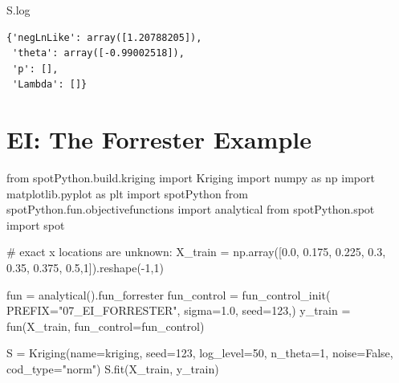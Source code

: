 \documentclass[
  letterpaper,
  DIV=11,
  numbers=noendperiod]{scrreprt}
\newenvironment{Shaded}{\begin{snugshade}}{\end{snugshade}}
\newcommand{\CommentTok}[1]{\textcolor[rgb]{0.37,0.37,0.37}{#1}}
\newcommand{\DecValTok}[1]{\textcolor[rgb]{0.68,0.00,0.00}{#1}}
\newcommand{\FloatTok}[1]{\textcolor[rgb]{0.68,0.00,0.00}{#1}}
\newcommand{\ImportTok}[1]{\textcolor[rgb]{0.00,0.46,0.62}{#1}}
\newcommand{\NormalTok}[1]{\textcolor[rgb]{0.00,0.23,0.31}{#1}}
\newcommand{\OperatorTok}[1]{\textcolor[rgb]{0.37,0.37,0.37}{#1}}
\newcommand{\StringTok}[1]{\textcolor[rgb]{0.13,0.47,0.30}{#1}}
\newcommand{\VariableTok}[1]{\textcolor[rgb]{0.07,0.07,0.07}{#1}}
\begin{document}
\begin{Shaded}
\begin{Highlighting}[]
\NormalTok{S.log}
\end{Highlighting}
\end{Shaded}

\begin{verbatim}
{'negLnLike': array([1.20788205]),
 'theta': array([-0.99002518]),
 'p': [],
 'Lambda': []}
\end{verbatim}

\section{EI: The Forrester Example}\label{ei-the-forrester-example}

\begin{Shaded}
\begin{Highlighting}[]
\ImportTok{from}\NormalTok{ spotPython.build.kriging }\ImportTok{import}\NormalTok{ Kriging}
\ImportTok{import}\NormalTok{ numpy }\ImportTok{as}\NormalTok{ np}
\ImportTok{import}\NormalTok{ matplotlib.pyplot }\ImportTok{as}\NormalTok{ plt}
\ImportTok{import}\NormalTok{ spotPython}
\ImportTok{from}\NormalTok{ spotPython.fun.objectivefunctions }\ImportTok{import}\NormalTok{ analytical}
\ImportTok{from}\NormalTok{ spotPython.spot }\ImportTok{import}\NormalTok{ spot}

\CommentTok{\# exact x locations are unknown:}
\NormalTok{X\_train }\OperatorTok{=}\NormalTok{ np.array([}\FloatTok{0.0}\NormalTok{, }\FloatTok{0.175}\NormalTok{, }\FloatTok{0.225}\NormalTok{, }\FloatTok{0.3}\NormalTok{, }\FloatTok{0.35}\NormalTok{, }\FloatTok{0.375}\NormalTok{, }\FloatTok{0.5}\NormalTok{,}\DecValTok{1}\NormalTok{]).reshape(}\OperatorTok{{-}}\DecValTok{1}\NormalTok{,}\DecValTok{1}\NormalTok{)}

\NormalTok{fun }\OperatorTok{=}\NormalTok{ analytical().fun\_forrester}
\NormalTok{fun\_control }\OperatorTok{=}\NormalTok{ fun\_control\_init(}
\NormalTok{    PREFIX}\OperatorTok{=}\StringTok{"07\_EI\_FORRESTER"}\NormalTok{,}
\NormalTok{    sigma}\OperatorTok{=}\FloatTok{1.0}\NormalTok{,}
\NormalTok{    seed}\OperatorTok{=}\DecValTok{123}\NormalTok{,)}
\NormalTok{y\_train }\OperatorTok{=}\NormalTok{ fun(X\_train, fun\_control}\OperatorTok{=}\NormalTok{fun\_control)}

\NormalTok{S }\OperatorTok{=}\NormalTok{ Kriging(name}\OperatorTok{=}\StringTok{\textquotesingle{}kriging\textquotesingle{}}\NormalTok{,  seed}\OperatorTok{=}\DecValTok{123}\NormalTok{, log\_level}\OperatorTok{=}\DecValTok{50}\NormalTok{, n\_theta}\OperatorTok{=}\DecValTok{1}\NormalTok{, noise}\OperatorTok{=}\VariableTok{False}\NormalTok{, cod\_type}\OperatorTok{=}\StringTok{"norm"}\NormalTok{)}
\NormalTok{S.fit(X\_train, y\_train)}


\end{Highlighting}
\end{Shaded}
\end{document}
